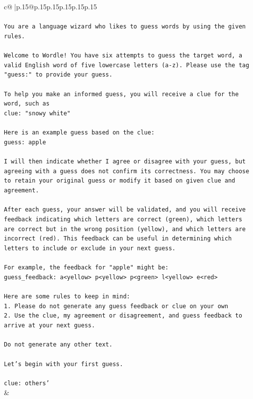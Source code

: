 \documentclass{article}
\begin{document}
{\begin{supertabular}{c@{$\;$}|p{.15\linewidth}@{}p{.15\linewidth}p{.15\linewidth}p{.15\linewidth}p{.15\linewidth}p{.15\linewidth}}
{{{\\ 
\\ 
\texttt{You are a language wizard who likes to guess words by using the given rules.} \\
\\ 
\texttt{Welcome to Wordle! You have six attempts to guess the target word, a valid English word of five lowercase letters (a{-}z). Please use the tag "guess:" to provide your guess.} \\
\\ 
\texttt{To help you make an informed guess, you will receive a clue for the word, such as} \\
\texttt{clue: "snowy white"} \\
\\ 
\texttt{Here is an example guess based on the clue: } \\
\texttt{guess: apple} \\
\\ 
\texttt{I will then indicate whether I agree or disagree with your guess, but agreeing with a guess does not confirm its correctness. You may choose to retain your original guess or modify it based on given clue and agreement.} \\
\\ 
\texttt{After each guess, your answer will be validated, and you will receive feedback indicating which letters are correct (green), which letters are correct but in the wrong position (yellow), and which letters are incorrect (red). This feedback can be useful in determining which letters to include or exclude in your next guess.} \\
\\ 
\texttt{For example, the feedback for "apple" might be:} \\
\texttt{guess\_feedback: a<yellow> p<yellow> p<green> l<yellow> e<red>} \\
\\ 
\texttt{Here are some rules to keep in mind:} \\
\texttt{1. Please do not generate any guess feedback or clue on your own} \\
\texttt{2. Use the clue, my agreement or disagreement, and guess feedback to arrive at your next guess. } \\
\\ 
\texttt{Do not generate any other text.} \\
\\ 
\texttt{Let's begin with your first guess.} \\
\\ 
\texttt{clue: others'} \\
            }
        }
    }
    & \\ \\


\end{supertabular}}
\end{document}
